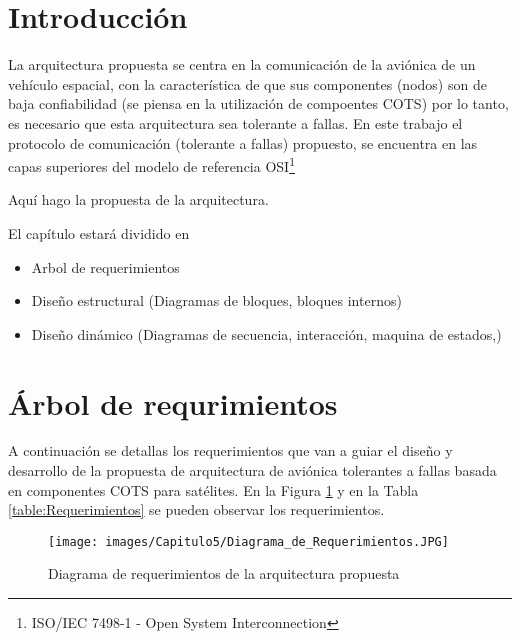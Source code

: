 \section{Introducción}

La arquitectura propuesta se centra en la comunicación de la aviónica de un
vehículo espacial, con la característica de que sus componentes (nodos) son
de baja confiabilidad (se piensa en la utilización de compoentes COTS)
por lo tanto, es necesario que esta arquitectura sea tolerante a fallas. En este
trabajo el protocolo de comunicación (tolerante a fallas) propuesto,
se encuentra en las capas superiores del modelo de referencia OSI\footnote{ISO/IEC 7498-1 - Open System Interconnection}


Aquí hago la propuesta de la arquitectura.

El capítulo estará dividido en

\begin{itemize}
\item Arbol de requerimientos
\item Diseño estructural (Diagramas de bloques, bloques internos)
\item Diseño dinámico (Diagramas de secuencia, interacción, maquina de estados,)
  
\end{itemize}

\section{Árbol de requrimientos}
A continuación se detallas los requerimientos que van a guiar el diseño y
desarrollo de la propuesta de arquitectura de aviónica tolerantes a fallas
basada en componentes \ac{COTS} para satélites. En la Figura
\ref{fig:DiagramaRequerimientos} y en la Tabla \ref{table:Requerimientos} se pueden
observar los requerimientos. 

\begin{figure}[h!]
 \centering
 \texttt{[image: images/Capitulo5/Diagrama\_de\_Requerimientos.JPG]}
  \caption{Diagrama de requerimientos de la arquitectura propuesta}
\label{fig:DiagramaRequerimientos}
\end{figure} 

